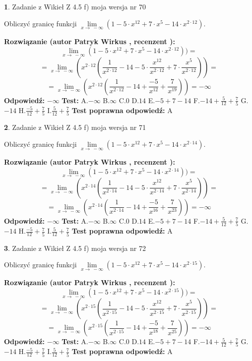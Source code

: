 \documentclass[12pt, a4paper]{article}
\theoremstyle{definition} %
\newtheorem{zad}{}
\newcommand{\zadStart}[1]{\begin{zad}#1\newline}
\newcommand{\zadStop}{\end{zad}}
\newcommand{\rozwStart}[2]{\noindent \textbf{Rozwiązanie (autor #1 , recenzent #2): }\newline}
\newcommand{\rozwStop}{\newline}
\newcommand{\odpStart}{\noindent \textbf{Odpowiedź:}\newline}
\newcommand{\odpStop}{\newline}
\newcommand{\testStart}{\noindent \textbf{Test:}\newline}
\newcommand{\testStop}{\newline}
\newcommand{\kluczStart}{\noindent \textbf{Test poprawna odpowiedź:}\newline}
\newcommand{\kluczStop}{\newline}
\begin{document}
\zadStart{Zadanie z Wikieł Z 4.5 f) moja wersja nr 70}



Obliczyć granicę funkcji  $\lim\limits_{x\to\ -\infty}(1 - 5 \cdot x^{12}+7 \cdot x^{5}- 14 \cdot x^{2\cdot12})$.
\zadStop
\rozwStart{Patryk Wirkus}{}
$$\lim\limits_{x\to\ -\infty}(1 - 5 \cdot x^{12}+7 \cdot x^{5}- 14 \cdot x^{2\cdot12}))=$$
$$=\lim\limits_{x\to\ -\infty}(x^{2\cdot12}(\frac{1}{x^{2\cdot12}}-14 -5 \cdot \frac{x^{12}}{x^{2\cdot12}}+7 \cdot \frac{x^{5}}{x^{2\cdot12}}))=$$
$$=\lim\limits_{x\to\ -\infty}(x^{2\cdot12}(\frac{1}{x^{2\cdot12}}-14 + \frac{-5}{x^{12}}+ \frac{7}{x^{19}}))=-\infty$$
\rozwStop
\odpStart
$-\infty$
\odpStop
\testStart
A.$-\infty$ B.$\infty$ C.$0$ D.$14$ E.$-5 + 7 - 14$
F.$-14+\frac{5}{12}+\frac{7}{5}$ G.$-14$
H.$\frac{-5}{12}+\frac{7}{5}$
I.$\frac{5}{12}+\frac{7}{5}$
\testStop
\kluczStart
A
\kluczStop



\zadStart{Zadanie z Wikieł Z 4.5 f) moja wersja nr 71}



Obliczyć granicę funkcji  $\lim\limits_{x\to\ -\infty}(1 - 5 \cdot x^{12}+7 \cdot x^{5}- 14 \cdot x^{2\cdot14})$.
\zadStop
\rozwStart{Patryk Wirkus}{}
$$\lim\limits_{x\to\ -\infty}(1 - 5 \cdot x^{12}+7 \cdot x^{5}- 14 \cdot x^{2\cdot14}))=$$
$$=\lim\limits_{x\to\ -\infty}(x^{2\cdot14}(\frac{1}{x^{2\cdot14}}-14 -5 \cdot \frac{x^{12}}{x^{2\cdot14}}+7 \cdot \frac{x^{5}}{x^{2\cdot14}}))=$$
$$=\lim\limits_{x\to\ -\infty}(x^{2\cdot14}(\frac{1}{x^{2\cdot14}}-14 + \frac{-5}{x^{16}}+ \frac{7}{x^{23}}))=-\infty$$
\rozwStop
\odpStart
$-\infty$
\odpStop
\testStart
A.$-\infty$ B.$\infty$ C.$0$ D.$14$ E.$-5 + 7 - 14$
F.$-14+\frac{5}{12}+\frac{7}{5}$ G.$-14$
H.$\frac{-5}{12}+\frac{7}{5}$
I.$\frac{5}{12}+\frac{7}{5}$
\testStop
\kluczStart
A
\kluczStop



\zadStart{Zadanie z Wikieł Z 4.5 f) moja wersja nr 72}



Obliczyć granicę funkcji  $\lim\limits_{x\to\ -\infty}(1 - 5 \cdot x^{12}+7 \cdot x^{5}- 14 \cdot x^{2\cdot15})$.
\zadStop
\rozwStart{Patryk Wirkus}{}
$$\lim\limits_{x\to\ -\infty}(1 - 5 \cdot x^{12}+7 \cdot x^{5}- 14 \cdot x^{2\cdot15}))=$$
$$=\lim\limits_{x\to\ -\infty}(x^{2\cdot15}(\frac{1}{x^{2\cdot15}}-14 -5 \cdot \frac{x^{12}}{x^{2\cdot15}}+7 \cdot \frac{x^{5}}{x^{2\cdot15}}))=$$
$$=\lim\limits_{x\to\ -\infty}(x^{2\cdot15}(\frac{1}{x^{2\cdot15}}-14 + \frac{-5}{x^{18}}+ \frac{7}{x^{25}}))=-\infty$$
\rozwStop
\odpStart
$-\infty$
\odpStop
\testStart
A.$-\infty$ B.$\infty$ C.$0$ D.$14$ E.$-5 + 7 - 14$
F.$-14+\frac{5}{12}+\frac{7}{5}$ G.$-14$
H.$\frac{-5}{12}+\frac{7}{5}$
I.$\frac{5}{12}+\frac{7}{5}$
\testStop
\kluczStart
A
\kluczStop
\end{document}
